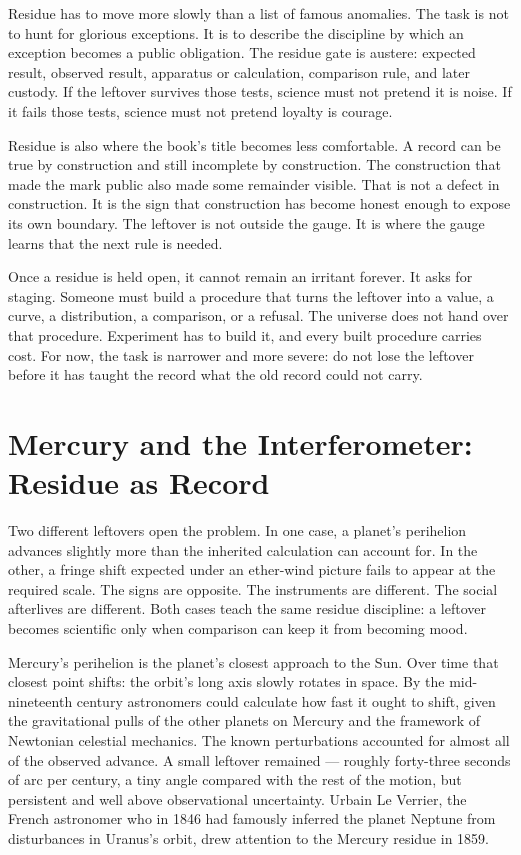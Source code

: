 \begin{chapteressay}
Residue has to move more slowly than a list of famous anomalies. The task is
not to hunt for glorious exceptions. It is to describe the discipline by which
an exception becomes a public obligation. The residue gate is austere: expected
result, observed result, apparatus or calculation, comparison rule, and later
custody. If the leftover survives those tests, science must not pretend it is
noise. If it fails those tests, science must not pretend loyalty is courage.

Residue is also where the book's title becomes less comfortable. A record can
be true by construction and still incomplete by construction. The construction
that made the mark public also made some remainder visible. That is not a
defect in construction. It is the sign that construction has become honest
enough to expose its own boundary. The leftover is not outside the gauge. It is
where the gauge learns that the next rule is needed.

Once a residue is held open, it cannot remain an irritant forever. It asks for
staging. Someone must build a procedure that turns the leftover into a value, a
curve, a distribution, a comparison, or a refusal. The universe does not hand
over that procedure. Experiment has to build it, and every built procedure
carries cost. For now, the task is narrower and more severe: do not lose the
leftover before it has taught the record what the old record could not carry.
\end{chapteressay}

\section{Mercury and the Interferometer: Residue as Record}

Two different leftovers open the problem. In one case, a planet's perihelion
advances slightly more than the inherited calculation can account for. In
the other, a fringe shift expected under an ether-wind picture fails to
appear at the required scale. The signs are opposite. The instruments are
different. The social afterlives are different. Both cases teach the same
residue discipline: a leftover becomes scientific only when comparison can
keep it from becoming mood.

Mercury's perihelion is the planet's closest approach to the Sun. Over time
that closest point shifts: the orbit's long axis slowly rotates in space.
By the mid-nineteenth century astronomers could calculate how fast it ought
to shift, given the gravitational pulls of the other planets on Mercury and
the framework of Newtonian celestial mechanics. The known perturbations
accounted for almost all of the observed advance. A small leftover
remained --- roughly forty-three seconds of arc per century, a tiny angle
compared with the rest of the motion, but persistent and well above
observational uncertainty. Urbain Le Verrier, the French astronomer who in
1846 had famously inferred the planet Neptune from disturbances in Uranus's
orbit, drew attention to the Mercury residue in 1859.

